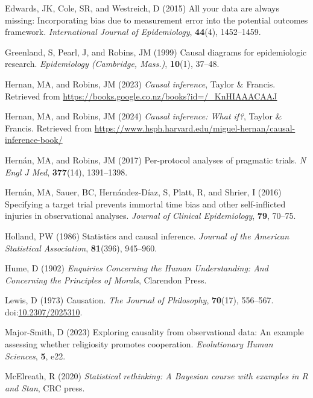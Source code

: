 \documentclass[
  singlecolumn]{article}
\newlength{\cslhangindent}
\newenvironment{CSLReferences}[2] %
 {\begin{list}{}{%
  \setlength{\itemindent}{0pt}
  \setlength{\leftmargin}{0pt}
  \setlength{\parsep}{0pt}
  \ifodd #1
   \setlength{\leftmargin}{\cslhangindent}
   \setlength{\itemindent}{-1\cslhangindent}
  \fi
  \setlength{\itemsep}{#2\baselineskip}}}
 {\end{list}}
\begin{document}
\begin{CSLReferences}{1}{0}
Edwards, JK, Cole, SR, and Westreich, D (2015) All your data are always
missing: Incorporating bias due to measurement error into the potential
outcomes framework. \emph{International Journal of Epidemiology},
\textbf{44}(4), 1452--1459.

Greenland, S, Pearl, J, and Robins, JM (1999) Causal diagrams for
epidemiologic research. \emph{Epidemiology (Cambridge, Mass.)},
\textbf{10}(1), 37--48.

Hernan, MA, and Robins, JM (2023) \emph{Causal inference}, Taylor \&
Francis. Retrieved from
\url{https://books.google.co.nz/books?id=/_KnHIAAACAAJ}

Hernan, MA, and Robins, JM (2024) \emph{Causal inference: What if?},
Taylor \& Francis. Retrieved from
\url{https://www.hsph.harvard.edu/miguel-hernan/causal-inference-book/}

Hernán, MA, and Robins, JM (2017) Per-protocol analyses of pragmatic
trials. \emph{N Engl J Med}, \textbf{377}(14), 1391--1398.

Hernán, MA, Sauer, BC, Hernández-Díaz, S, Platt, R, and Shrier, I (2016)
Specifying a target trial prevents immortal time bias and other
self-inflicted injuries in observational analyses. \emph{Journal of
Clinical Epidemiology}, \textbf{79}, 70--75.

Holland, PW (1986) Statistics and causal inference. \emph{Journal of the
American Statistical Association}, \textbf{81}(396), 945--960.

Hume, D (1902) \emph{Enquiries Concerning the Human Understanding: And
Concerning the Principles of Morals}, Clarendon Press.

Lewis, D (1973) Causation. \emph{The Journal of Philosophy},
\textbf{70}(17), 556--567.
doi:\href{https://doi.org/10.2307/2025310}{10.2307/2025310}.

Major-Smith, D (2023) Exploring causality from observational data: An
example assessing whether religiosity promotes cooperation.
\emph{Evolutionary Human Sciences}, \textbf{5}, e22.

McElreath, R (2020) \emph{Statistical rethinking: A {B}ayesian course
with examples in {R} and {S}tan}, CRC press.


\end{CSLReferences}
\end{document}
